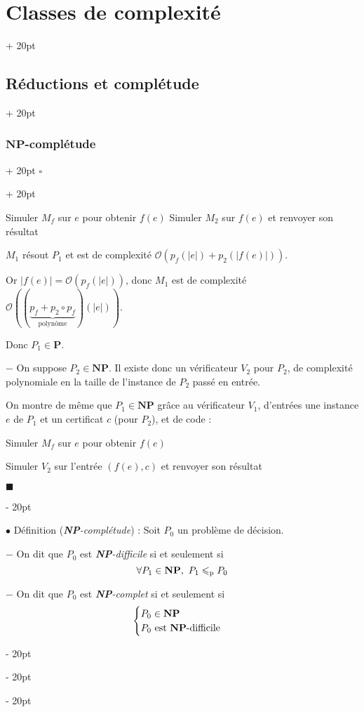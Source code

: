\documentclass[a4paper, 12pt, twoside]{article}
\newenvironment{indalgo}[2][H]{
    \begin{algoBox}
        \begin{algorithm}[#1]
            \caption{#2}
}
{
        \end{algorithm}
    \end{algoBox}
}
\newcommand{\abs}[1]{\left\lvert #1 \right\rvert}
\renewcommand{\le}{\leqslant}
\newcommand{\ind}[1][20pt]{\advance\leftskip + #1}
\newcommand{\deind}[1][20pt]{\advance\leftskip - #1}
\newenvironment{indt}[2][20pt]{#2 \par \ind[#1]}{\par \deind} %
\newenvironment{proof}[1][{}]{\begin{indt}{$\square$ #1}}{$\blacksquare$ \end{indt}}
\begin{document}
\begin{indt}{\section{Classes de complexité}}
\begin{indt}{\subsection{Réductions et complétude}}
\begin{indt}{\subsubsection{$\mathbf{NP}$-complétude}}
\begin{proof}
\begin{indalgo}{$M_1$}
                        Simuler $M_f$ sur $e$ pour obtenir $f(e)$\;
                        Simuler $M_2$ sur $f(e)$ et renvoyer son résultat\;
                    \end{indalgo}

                    $M_1$ résout $P_1$ et est de complexité $\mathcal O(p_f(\abs e) + p_2(\abs{f(e)}))$.

                    Or $\abs{f(e)} = \mathcal O(p_f(\abs e))$, donc $M_1$ est de complexité $\mathcal O((\underbrace{p_f + p_2 \circ p_f}_{\text{polynôme}})(\abs e))$.

                    Donc $P_1 \in \mathbf P$.

                    \vspace{6pt}
                    
                    $-$ On suppose $P_2 \in \mathbf{NP}$. Il existe donc un vérificateur $V_2$ pour $P_2$, de complexité polynomiale en la taille de l'instance de $P_2$ passé en entrée.

                    On montre de même que $P_1 \in \mathbf{NP}$ grâce au vérificateur $V_1$, d'entrées une instance $e$ de $P_1$ et un certificat $c$ (pour $P_2$), et de code :
                    \begin{indalgo}{$V_1$}

                        \BlankLine

                        Simuler $M_f$ sur $e$ pour obtenir $f(e)$\;

                        Simuler $V_2$ sur l'entrée $(f(e), c)$ et renvoyer son résultat\;
                    \end{indalgo}
                \end{proof}

                \vspace{12pt}
                
                $\bullet$ Définition (\textit{\textbf{NP}-complétude}) :
                Soit $P_0$ un problème de décision.

                $-$ On dit que $P_0$ est \emph{\textbf{NP}-difficile} si et seulement si
                \[
                    \forall P_1 \in \mathbf{NP},\ P_1 \le_{\rm p} P_0
                \]

                $-$ On dit que $P_0$ est \emph{\textbf{NP}-complet} si et seulement si
                \[
                    \begin{cases}
                        P_0 \in \mathbf{NP}
                        \\
                        P_0\ \text{est \textbf{NP}-difficile}
                    \end{cases}
                \]


\end{indt}
\end{indt}
\end{indt}
\end{document}
